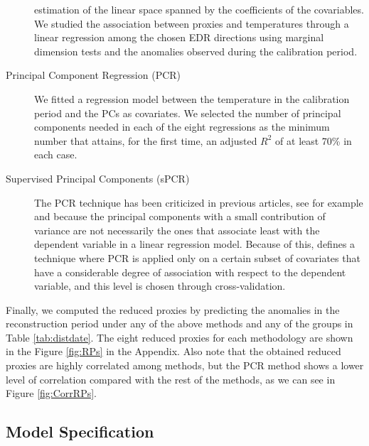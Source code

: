 \documentclass[11pt]{amsart}
\theoremstyle{plain}
\theoremstyle{definition}
\theoremstyle{remark}
\begin{document}
\begin{description}
  estimation of the linear space spanned by the coefficients of the covariables.
  We studied the association between proxies and temperatures
  through a linear regression among the chosen EDR directions using marginal
  dimension tests and the anomalies observed
  during the calibration period. 
\item[Principal Component Regression (PCR)]
We fitted a regression model between the temperature in the calibration period and the PCs
as covariates. We selected the number of principal components needed in each of
the eight regressions as the minimum number that attains, for the first time, an adjusted
$R^2$ of at least 70\% in each case. 
\item[Supervised Principal Components (sPCR)]
The PCR technique has been criticized in previous articles, see for example
\cite{Jolliffe1982} and \cite{Tibshirani1996} because the principal components
with a small contribution of variance are not necessarily the ones that
associate least with the dependent variable in a linear regression model.
Because of this, \cite{Bair2006} defines a technique where PCR is applied only
on a certain subset of covariates that have a considerable degree of association
with respect to the dependent variable, and this level is chosen through cross-validation.
\end{description}
Finally, we computed the reduced proxies by predicting the anomalies in the
reconstruction period under any of the above methods and any of the groups in
Table \ref{tab:distdate}. The eight reduced proxies for each methodology are
shown in the Figure \ref{fig:RPs} in the Appendix. Also note that
the obtained reduced proxies are highly correlated among methods, but the PCR
method shows a lower level of correlation compared with the rest of the methods,
as we can see in Figure \ref{fig:CorrRPs}.  

\subsection{Model Specification}
\label{sec:modelspec}
\end{document}
